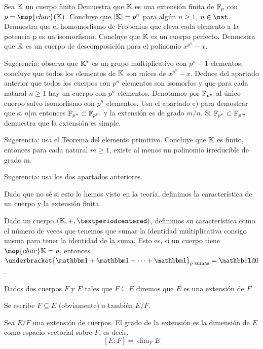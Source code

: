 \begin{problem}
Sea $\mathbb{K}$ un cuerpo finito
\ppart Demuestra que $\mathbb{K}$ es una extensión finita de $\mathbb{F}_p$ con $p = \mop{char} (\K)$. Concluye que $|\mathbb{K}| = p^n$ para algún $n \geq 1$, $n \in \nat$.
\ppart Demuestra que el homomorfismo de Frobenius que eleva cada elemento a la potencia p es un isomorfismo. Concluye que $\mathbb{K}$ es un cuerpo perfecto.
\ppart Demuestra que $\mathbb{K}$ es un cuerpo de descomposición para el polinomio $x^{p^n}-x$.

Sugerencia: observa que $\mathbb{K}^*$ es un grupo multiplicativo con $p^n - 1$ elementos, concluye que todos los elementos de $\mathbb{K}$ son raíces de $x^{p^n}-x$.
\ppart Deduce del apartado anterior que todos los cuerpos con $p^n$ elementos son isomorfos y que para cada natural $n \geq 1$ hay un cuerpo con $p^n$ elementos. Denotamos por $\mathbb{F}_{p^n}$ al único cuerpo salvo isomorfismo con $p^n$ elementos.
\ppart Usa el apartado c) para demostrar que si $n|m$ entonces $\mathbb{F}_{p^n} \subset \mathbb{F}_{p^m}$ y la extensión es de grado $m/n$.
\ppart Si $\mathbb{F}_{p^n} \subset \mathbb{F}_{p^m}$ demuestra que la extensión es simple.

Sugerencia: usa el Teorema del elemento primitivo.
\ppart Concluye que $\mathbb{K}$ es finito, entonces para cada natural $m \geq 1$, existe al menos un polinomio irreducible de grado m.

Sugerencia: usa los dos apartados anteriores.
\solution


Dado que no sé si esto lo hemos visto en la teoría, definimos la característica de un cuerpo y la extensión finita.

\begin{defn}
Dado un cuerpo $(\K, +, ·)$, definimos su característica como el número de veces que tenemos que sumar la identidad multiplicativa consigo misma para tener la identidad de la suma. Esto es, si un cuerpo tiene $\mop{char} \K = p$, entonces $\underbracket{\one + \one + \dotsb + \one}_{p\text{ sumas}} = \zero$.
\end{defn}

\begin{defn} \citep[Def. I.1]{apuntesGalois}
Dados dos cuerpos $F$ y $E$ tales que $F⊆E$ diremos que $E$ es una extensión de $F$.

Se escribe $F⊆E$ (obviamente) o también $E/F$.
\end{defn}


\begin{defn} \citep[Def I.3]{apuntesGalois}
Sea $E/F$ una extensión de cuerpos.
El grado de la extensión es la dimensión de $E$ como espacio vectorial sobre $F$, es decir, \[[E:F] = \dim_FE \]
\end{defn}


\end{problem}
